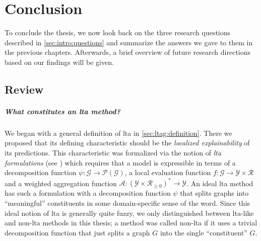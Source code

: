 \chapter{Conclusion}%
\label{sec:conclusion}

To conclude the thesis, we now look back on the three research questions described in \cref{sec:intro:questions} and summarize the answers we gave to them in the previous chapters.
Afterwards, a brief overview of future research directions based on our findings will be given.

\section{Review}%
\label{sec:conclusion:review}

\paragraph{\; What constitutes an \ac{lta} method?}
We began with a general definition of \ac{lta} in \cref{sec:ltag:definition}.
There we proposed that its defining characteristic should be the \textit{localized explainability} of its predictions.
This characteristic was formalized via the notion of \textit{\ac{lta} formulations} (see ) which requires that a model is expressible in terms of a decomposition function $\psi: \mathcal{G} \to \mathcal{P}(\mathcal{G})$, a local evaluation function $f: \mathcal{G} \to \mathcal{Y} \times \mathcal{R}$ and a weighted aggregation function $\mathcal{A}: {(\mathcal{Y} \times \mathcal{R}_{\geq 0})}^* \to \mathcal{Y}$.
An ideal \ac{lta} method has such a formulation with a decomposition function $\psi$ that splits graphs into ``meaningful'' constituents in some domain-specific sense of the word.
Since this ideal notion of \ac{lta} is generally quite fuzzy, we only distinguished between \acs{lta}-like and non-\acs{lta} methods in this thesis;
a method was called non-\acs{lta} if it uses a trivial decomposition function that just splits a graph $G$ into the single ``constituent'' $G$.


